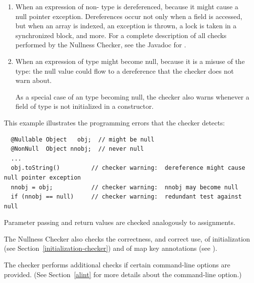 \begin{enumerate}

\item
  When an expression of non- type
  is dereferenced, because it might cause a null pointer exception.
  Dereferences occur not only when a field is accessed, but when an array
  is indexed, an exception is thrown, a lock is taken in a synchronized
  block, and more.  For a complete description of all checks performed by
  the Nullness Checker, see the Javadoc for
  .

\item
  When an expression of  type
  might become null, because it
  is a misuse of the type:  the null value could flow to a dereference that
  the checker does not warn about.

  As a special case of an 
  type becoming null, the checker also warns whenever a field of
   type is not initialized in a
  constructor.

\end{enumerate}

This example illustrates the programming errors that the checker detects:

\begin{Verbatim}
  @Nullable Object   obj;  // might be null
  @NonNull  Object nnobj;  // never null
  ...
  obj.toString()         // checker warning:  dereference might cause null pointer exception
  nnobj = obj;           // checker warning:  nnobj may become null
  if (nnobj == null)     // checker warning:  redundant test against null
\end{Verbatim}

Parameter passing and return values are checked analogously to assignments.

The Nullness Checker also checks the correctness, and correct use, of
initialization (see
Section~\ref{initialization-checker}) and of map key annotations (see
).


The checker performs additional checks if certain 
command-line options are provided.  (See
Section~\ref{alint} for more details about the 
command-line option.)



